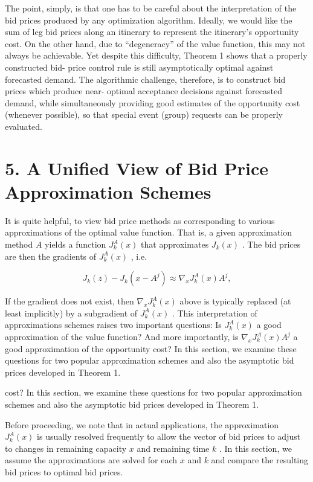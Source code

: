The point, simply, is that one has to be careful about the
interpretation of the bid prices produced by any optimization algorithm.
Ideally, we would like the sum of leg bid prices along an itinerary to
represent the itinerary's opportunity cost. On the other hand, due to
``degeneracy'' of the value function, this may not always be achievable.
Yet despite this difficulty, Theorem 1 shows that a properly constructed
bid- price control rule is still asymptotically optimal against
forecasted demand. The algorithmic challenge, therefore, is to construct
bid prices which produce near- optimal acceptance decisions against
forecasted demand, while simultaneously providing good estimates of the
opportunity cost (whenever possible), so that special event (group)
requests can be properly evaluated.

\section{5. A Unified View of Bid Price Approximation
Schemes}\label{a-unified-view-of-bid-price-approximation-schemes}

It is quite helpful, to view bid price methods as corresponding to
various approximations of the optimal value function. That is, a given
approximation method \(A\) yields a function \(J_{k}^{A}(x)\) that
approximates \(J_{k}(x)\) . The bid prices are then the gradients of
\(J_{k}^{A}(x)\) , i.e.

\[
J_{k}(z) - J_{k}(x - A^{j})\approx \nabla_{x}J_{k}^{A}(x)A^{j},
\]

If the gradient does not exist, then \(\nabla_{x}J_{k}^{A}(x)\) above is
typically replaced (at least implicitly) by a subgradient of
\(J_{k}^{A}(x)\) . This interpretation of approximations schemes raises
two important questions: Is \(J_{k}^{A}(x)\) a good approximation of the
value function? And more importantly, is \(\nabla_{x}J_{k}^{A}(x)A^{j}\)
a good approximation of the opportunity cost? In this section, we
examine these questions for two popular approximation schemes and also
the asymptotic bid prices developed in Theorem 1.

cost? In this section, we examine these questions for two popular
approximation schemes and also the asymptotic bid prices developed in
Theorem 1.

Before proceeding, we note that in actual applications, the
approximation \(J_{k}^{A}(x)\) is usually resolved frequently to allow
the vector of bid prices to adjust to changes in remaining capacity
\(x\) and remaining time \(k\) . In this section, we assume the
approximations are solved for each \(x\) and \(k\) and compare the
resulting bid prices to optimal bid prices.

